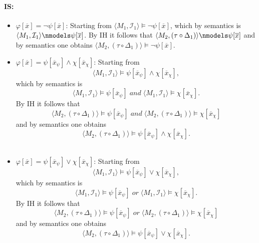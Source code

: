 \documentclass[11pt,a4paper]{article}
\newcommand{\sand}{\; and \;}
\newcommand{\sor}{ \; or \;}
\begin{document}
\paragraph*{IS:}
\begin{itemize}[leftmargin=*]
\item $\varphi[\overline{x}] = \neg  \psi[\overline{x}]$: Starting from $\langle M_1, \mathcal{I}_1 \rangle \models \neg  \psi[\overline{x}]$, which by semantics is $\langle M_1, \mathcal{I}_1 \rangle \nmodels \psi[\overline{x}]$. By IH it follows that $\langle M_2, (\tau \circ \Delta_1) \rangle \nmodels \psi[\overline{x}]$ and by semantics one obtains $\langle M_2, (\tau \circ \Delta_1) \rangle \models \neg \psi[\overline{x}]$.\\


\item $\varphi[\overline{x}] = \psi[\overline{x}_{\psi}] \land \chi[\overline{x}_{\chi}]$:
Starting from 
\begin{equation*}
\langle M_1, \mathcal{I}_1 \rangle \models \psi[\overline{x}_{\psi}] \land \chi[\overline{x}_{\chi}],
\end{equation*}
which by semantics is 
\begin{equation*}
\langle M_1, \mathcal{I}_1 \rangle \models \psi[\overline{x}_{\psi}] \sand \langle M_1, \mathcal{I}_1 \rangle \models \chi[\overline{x}_{\chi}].
\end{equation*}
By IH it follows that  
\begin{equation*}
\langle M_2, (\tau \circ \Delta_1) \rangle \models \psi[\overline{x}_{\psi}] \sand\langle M_2, (\tau \circ \Delta_1) \rangle \models \chi[\overline{x}_{\chi}]
\end{equation*}
and by semantics one obtains 
\begin{equation*}
\langle M_2, (\tau \circ \Delta_1) \rangle \models \psi[\overline{x}_{\psi}] \land \chi[\overline{x}_{\chi}].
\end{equation*}\\
 

\item $\varphi[\overline{x}] = \psi[\overline{x}_{\psi}] \lor \chi[\overline{x}_{\chi}]$:
Starting from 
\begin{equation*}
\langle M_1, \mathcal{I}_1 \rangle \models \psi[\overline{x}_{\psi}] \lor \chi[\overline{x}_{\chi}],
\end{equation*}
which by semantics is 
\begin{equation*}
\langle M_1, \mathcal{I}_1 \rangle \models \psi[\overline{x}_{\psi}] \sor \langle M_1, \mathcal{I}_1 \rangle \models \chi[\overline{x}_{\chi}].
\end{equation*}
By IH it follows that  
\begin{equation*}
\langle M_2, (\tau \circ \Delta_1) \rangle \models \psi[\overline{x}_{\psi}] \sor\langle M_2, (\tau \circ \Delta_1) \rangle \models \chi[\overline{x}_{\chi}]
\end{equation*}
and by semantics one obtains 
\begin{equation*}
\langle M_2, (\tau \circ \Delta_1) \rangle \models \psi[\overline{x}_{\psi}] \lor \chi[\overline{x}_{\chi}].
\end{equation*}\\


\end{itemize}
\end{document}
